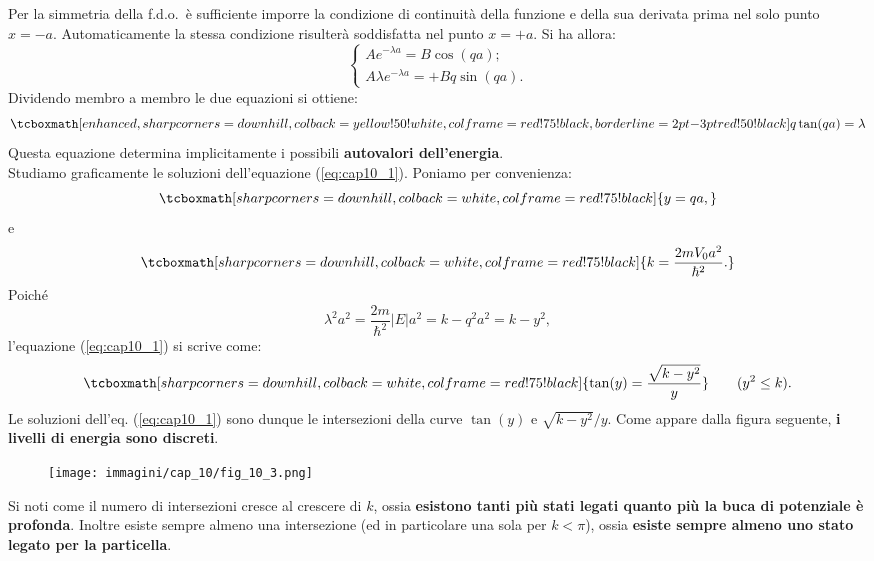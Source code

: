 \documentclass[a4paper,12pt,oneside]{book}
\begin{document}
Per la simmetria della f.d.o.~è sufficiente imporre la condizione di continuità della funzione e della sua derivata prima nel solo punto $x=-a$. Automaticamente la stessa condizione risulterà soddisfatta nel punto $x=+a$. Si ha allora:
	\begin{equation}
		\begin{cases}
		Ae^{-\lambda a} =B\cos(qa) ;\\
		A \lambda e^{-\lambda a} = +Bq \sin(qa).\end{cases} 
	\end{equation}
Dividendo membro a membro le due equazioni si ottiene:
	\begin{equation}
		\tcboxmath[enhanced, sharp corners=downhill, colback=yellow!50!white, colframe=red!75!black, borderline={2pt}{-3pt}{red!50!black}]{
			q \tan (qa) =\lambda
			}
	\label{eq:cap10_1}
	\end{equation}
Questa equazione determina implicitamente i possibili \textbf{autovalori dell'energia}.\\

Studiamo graficamente le soluzioni dell'equazione (\ref{eq:cap10_1}). Poniamo per convenienza:
	\begin{equation}
		\tcboxmath[sharp corners=downhill, colback=white, colframe=red!75!black]{
			y=qa,
			}
	\end{equation}
e
	\begin{equation}
		\tcboxmath[sharp corners=downhill, colback=white, colframe=red!75!black]{
		k=\frac{2mV_0 a^2}{\hbar ^2}.
		}
	\end{equation}
Poiché
	\begin{equation}
		\lambda ^2 a^2 = \frac{2m }{\hbar ^2}|E|a^2=k-q^2 a^2 =k-y^2,
	\end{equation}
l'equazione (\ref{eq:cap10_1}) si scrive come:
	\begin{equation}
		\tcboxmath[sharp corners=downhill, colback=white, colframe=red!75!black]{
			\tan (y) = \frac{\sqrt{k-y^2}}{y}
			} \qquad (y^2 \leq k).
	\end{equation}
Le soluzioni dell'eq. (\ref{eq:cap10_1}) sono dunque le intersezioni della curve $\tan (y)$ e $\sqrt{k-y^2}/y$. Come appare dalla figura seguente, \textbf{i livelli di energia sono discreti}.
\begin{figure}[!htbp]
\texttt{[image: immagini/cap\_10/fig\_10\_3.png]}
\end{figure}
\newpage

Si noti come il numero di intersezioni cresce al crescere di $k$, ossia \textbf{esistono tanti più stati legati quanto più la buca di potenziale è profonda}. Inoltre esiste sempre almeno una intersezione (ed in particolare una sola per $k<\pi$), ossia \textbf{esiste sempre almeno uno stato legato per la particella}.\\
\end{document}
